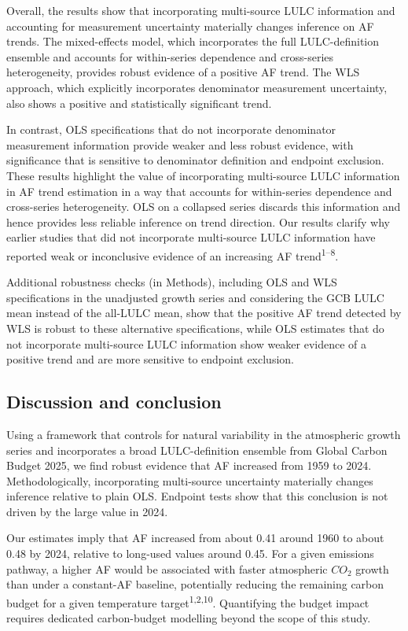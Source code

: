 \documentclass[
  12pt,
  letterpaper,
  DIV=11,
  numbers=noendperiod]{scrartcl}
\begin{document}
Overall, the results show that incorporating multi-source LULC
information and accounting for measurement uncertainty materially
changes inference on AF trends. The mixed-effects model, which
incorporates the full LULC-definition ensemble and accounts for
within-series dependence and cross-series heterogeneity, provides robust
evidence of a positive AF trend. The WLS approach, which explicitly
incorporates denominator measurement uncertainty, also shows a positive
and statistically significant trend.

In contrast, OLS specifications that do not incorporate denominator
measurement information provide weaker and less robust evidence, with
significance that is sensitive to denominator definition and endpoint
exclusion. These results highlight the value of incorporating
multi-source LULC information in AF trend estimation in a way that
accounts for within-series dependence and cross-series heterogeneity.
OLS on a collapsed series discards this information and hence provides
less reliable inference on trend direction. Our results clarify why
earlier studies that did not incorporate multi-source LULC information
have reported weak or inconclusive evidence of an increasing AF
trend\textsuperscript{1--8}.

Additional robustness checks (in Methods), including OLS and WLS
specifications in the unadjusted growth series and considering the GCB
LULC mean instead of the all-LULC mean, show that the positive AF trend
detected by WLS is robust to these alternative specifications, while OLS
estimates that do not incorporate multi-source LULC information show
weaker evidence of a positive trend and are more sensitive to endpoint
exclusion.

\subsection*{Discussion and conclusion}\label{discussion-and-conclusion}

Using a framework that controls for natural variability in the
atmospheric growth series and incorporates a broad LULC-definition
ensemble from Global Carbon Budget 2025, we find robust evidence that AF
increased from 1959 to 2024. Methodologically, incorporating
multi-source uncertainty materially changes inference relative to plain
OLS. Endpoint tests show that this conclusion is not driven by the large
value in 2024.

Our estimates imply that AF increased from about 0.41 around 1960 to
about 0.48 by 2024, relative to long-used values around 0.45. For a
given emissions pathway, a higher AF would be associated with faster
atmospheric \(CO_2\) growth than under a constant-AF baseline,
potentially reducing the remaining carbon budget for a given temperature
target\textsuperscript{1,2,10}. Quantifying the budget impact requires
dedicated carbon-budget modelling beyond the scope of this study.
\end{document}

